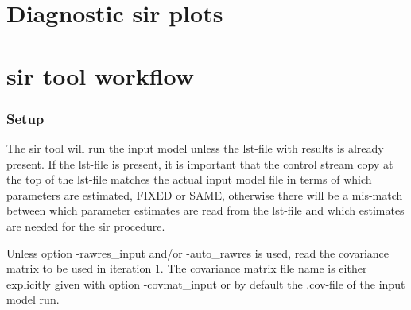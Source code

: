 \section{Diagnostic sir plots}
\newcommand{\rplotsconditions}{
See section Output, subsections Basic and Extended diagnostic plots, for descriptions of the default sir plots. The default sir template requires that R libraries gplots, ggplot2, plyr, dplyr, reshape, gridExtra, RColorBrewer, tidyr, MCMCpack and stats4 are installed. If the conditions are not fulfilled then no pdf will be generated, see the .Rout file in the main run directory for error messages.}



\section{sir tool workflow}
\subsubsection*{Setup}
The sir tool will run the input model unless the lst-file with results is already present. If the lst-file is present, it
is important that the control stream copy at the top of the lst-file matches the actual input model file in terms of which parameters are estimated, FIXED or SAME, otherwise there will be a mis-match between which parameter estimates are read from the lst-file and which estimates are needed for the sir procedure.

Unless option -rawres\_input and/or -auto\_rawres is used, read the covariance matrix to be used in iteration 1. The covariance matrix file name is either explicitly given with option -covmat\_input or by default the .cov-file of the input model run.

